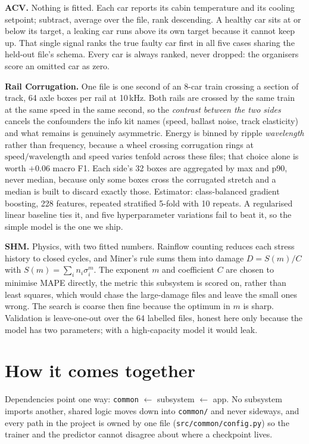 \documentclass[11pt,a4paper]{article}
\begin{document}
\textbf{ACV.} Nothing is fitted. Each car reports its cabin temperature and its cooling setpoint;
subtract, average over the file, rank descending. A healthy car sits at or below its target, a
leaking car runs above its own target because it cannot keep up. That single signal ranks the true
faulty car first in all five cases sharing the held-out file's schema. Every car is always ranked,
never dropped: the organisers score an omitted car as zero.

\textbf{Rail Corrugation.} One file is one second of an 8-car train crossing a section of track,
64 axle boxes per rail at 10\,kHz. Both rails are crossed by the same train at the same speed in
the same second, so the \emph{contrast between the two sides} cancels the confounders the info kit
names (speed, ballast noise, track elasticity) and what remains is genuinely asymmetric. Energy is
binned by ripple \emph{wavelength} rather than frequency, because a wheel crossing corrugation
rings at $\text{speed}/\text{wavelength}$ and speed varies tenfold across these files; that choice
alone is worth $+0.06$ macro F1. Each side's 32 boxes are aggregated by max and p90, never median,
because only some boxes cross the corrugated stretch and a median is built to discard exactly
those. Estimator: class-balanced gradient boosting, 228 features, repeated stratified 5-fold with
10 repeats. A regularised linear baseline ties it, and five hyperparameter variations fail to beat
it, so the simple model is the one we ship.

\textbf{SHM.} Physics, with two fitted numbers. Rainflow counting reduces each stress history to
closed cycles, and Miner's rule sums them into damage $D = S(m)/C$ with
$S(m)=\sum_i n_i \sigma_i^{m}$. The exponent $m$ and coefficient $C$ are chosen to minimise MAPE
directly, the metric this subsystem is scored on, rather than least squares, which would chase the
large-damage files and leave the small ones wrong. The search is coarse then fine because the
optimum in $m$ is sharp. Validation is leave-one-out over the 64 labelled files, honest here only
because the model has two parameters; with a high-capacity model it would leak.

\section{How it comes together}

Dependencies point one way: \texttt{common} $\leftarrow$ subsystem $\leftarrow$ app. No subsystem
imports another, shared logic moves down into \texttt{common/} and never sideways, and every path
in the project is owned by one file (\texttt{src/common/config.py}) so the trainer and the
predictor cannot disagree about where a checkpoint lives.
\end{document}
